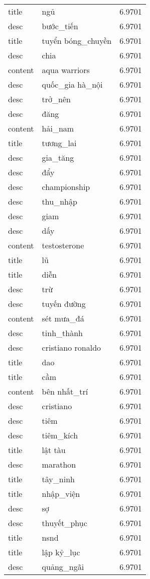 \documentclass{article}
\begin{document}
\begin{tabular}{lll}
title & ngủ & 6.9701\\
desc & bước\_tiến & 6.9701\\
title & tuyển bóng\_chuyền & 6.9701\\
desc & chia & 6.9701\\
content & aqua warriors & 6.9701\\
desc & quốc\_gia hà\_nội & 6.9701\\
desc & trở\_nên & 6.9701\\
desc & đăng & 6.9701\\
content & hải\_nam & 6.9701\\
title & tương\_lai & 6.9701\\
desc & gia\_tăng & 6.9701\\
desc & đẩy & 6.9701\\
desc & championship & 6.9701\\
desc & thu\_nhập & 6.9701\\
desc & giam & 6.9701\\
desc & dấy & 6.9701\\
content & testosterone & 6.9701\\
title & lũ & 6.9701\\
title & diễn & 6.9701\\
desc & trừ & 6.9701\\
desc & tuyến đường & 6.9701\\
content & sét mưa\_đá & 6.9701\\
desc & tỉnh\_thành & 6.9701\\
desc & cristiano ronaldo & 6.9701\\
title & dao & 6.9701\\
title & cầm & 6.9701\\
content & bên nhất\_trí & 6.9701\\
desc & cristiano & 6.9701\\
desc & tiêm & 6.9701\\
desc & tiêm\_kích & 6.9701\\
title & lật tàu & 6.9701\\
desc & marathon & 6.9701\\
title & tây\_ninh & 6.9701\\
title & nhập\_viện & 6.9701\\
desc & sợ & 6.9701\\
desc & thuyết\_phục & 6.9701\\
title & nsnd & 6.9701\\
title & lập kỷ\_lục & 6.9701\\
desc & quảng\_ngãi & 6.9701\\

\end{tabular}
\end{document}

